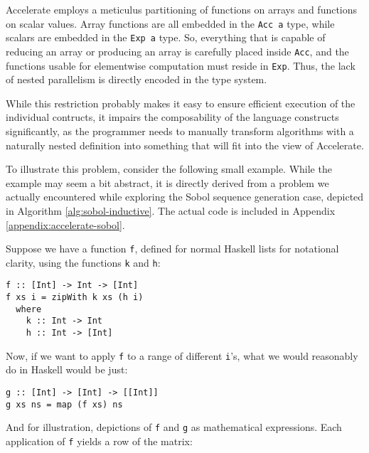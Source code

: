 Accelerate employs a meticulus partitioning of functions on arrays and functions
on scalar values. Array functions are all embedded in the \lstinline{Acc a} type,
while scalars are embedded in the \lstinline{Exp a} type. So, everything that is
capable of reducing an array or producing an array is carefully placed inside
\lstinline{Acc}, and the functions usable for elementwise computation must
reside in \lstinline{Exp}. Thus, the lack of nested parallelism is directly
encoded in the type system.

While this restriction probably makes it easy to ensure efficient execution of
the individual contructs, it impairs the composability of the language
constructs significantly, as the programmer needs to manually transform
algorithms with a naturally nested definition into something that will fit into
the view of Accelerate.

To illustrate this problem, consider the following small example.  While the example may seem a bit
abstract, it is directly derived from a problem we actually encountered while exploring
the Sobol sequence generation case, depicted in Algorithm
\ref{alg:sobol-inductive}. The actual code is included in Appendix
\ref{appendix:accelerate-sobol}.

Suppose we have a function \lstinline{f}, defined for normal Haskell lists for notational clarity,
using the functions \lstinline{k} and \lstinline{h}:

\begin{verbatim}
f :: [Int] -> Int -> [Int]
f xs i = zipWith k xs (h i)
  where
    k :: Int -> Int
    h :: Int -> [Int]
\end{verbatim}

Now, if we want to apply \lstinline{f} to a range of different \lstinline{i}'s, what
we would reasonably do in Haskell would be just:

\begin{verbatim}
g :: [Int] -> [Int] -> [[Int]]
g xs ns = map (f xs) ns
\end{verbatim}

And for illustration, depictions of \lstinline{f} and \lstinline{g} as mathematical
expressions. Each application of \lstinline{f} yields a row of the matrix:

